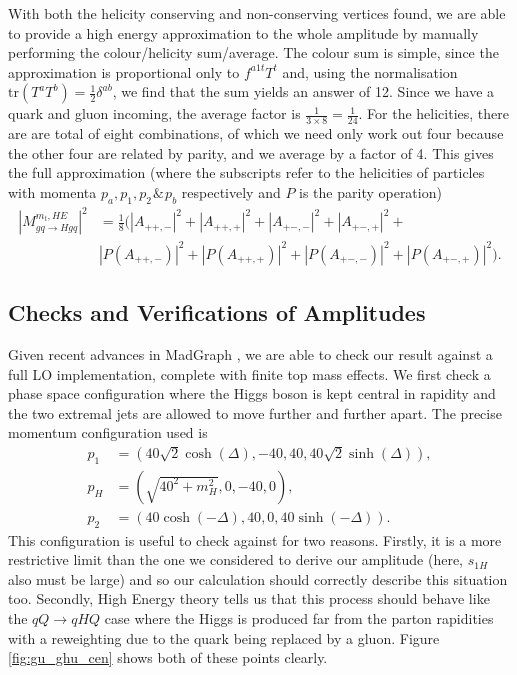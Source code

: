 With both the helicity conserving and non-conserving vertices found, we are able to provide a high energy approximation to the whole amplitude by manually performing the colour/helicity sum/average. The colour sum is simple, since the approximation is proportional only to $f^{a1t} T^t$ and, using the normalisation $\text{tr}(T^a T^b) = \frac{1}{2}\delta^{ab}$, we find that the sum yields an answer of 12. Since we have a quark and gluon incoming, the average factor is $\frac{1}{3 \times 8} = \frac{1}{24}$. For the helicities, there are are total of eight combinations, of which we need only work out four because the other four are related by parity, and we average by a factor of 4.  This gives the full approximation (where the subscripts refer to the helicities of particles with momenta $p_a,p_1,p_2 \hspace{1pt} \& \hspace{1pt} p_b$ respectively and $P$ is the parity operation)
\begin{equation}
\begin{split}
|M_{gq \to Hgq}^{m_t, HE}|^2 &= \frac{1}{8} \Big( |A_{++,-}|^2 + |A_{++,+}|^2 + |A_{+-,-}|^2 + |A_{+-,+}|^2 + \\
&|P(A_{++,-})|^2 + |P(A_{++,+})|^2 + |P(A_{+-,-})|^2 + |P(A_{+-,+})|^2 \Big).
\end{split}
\end{equation}

\subsection{Checks and Verifications of Amplitudes}

Given recent advances in MadGraph \cite{Alwall2007}, we are able to check our result against a full LO implementation, complete with finite top mass effects. We first check a phase space configuration where the Higgs boson is kept central in rapidity and the two extremal jets are allowed to move further and further apart. The precise momentum configuration used is 
\begin{subequations}
\begin{align}
p_1 &= (40 \sqrt{2} \cosh(\Delta),-40,40,40 \sqrt{2} \sinh(\Delta)), \\
p_H &= (\sqrt{40^2+m_H^2}, 0,-40,0), \\
p_2 &= (40 \cosh(-\Delta),40,0,40 \sinh(-\Delta)).
\end{align}
\end{subequations}
This configuration is useful to check against for two reasons. Firstly, it is a more restrictive limit than the one we considered to derive our amplitude (here, $s_{1H}$ also must be large) and so our calculation should correctly describe this situation too. Secondly, High Energy theory tells us that this process should behave like the $qQ \to qHQ$ case where the Higgs is produced far from the parton rapidities with a reweighting due to the quark being replaced by a gluon. Figure \ref{fig:gu_ghu_cen} shows both of these points clearly. 

